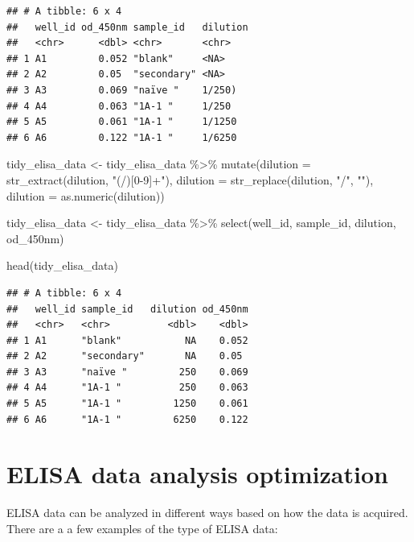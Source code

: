 \documentclass[
]{book}
\newenvironment{Shaded}{\begin{snugshade}}{\end{snugshade}}
\newcommand{\AttributeTok}[1]{\textcolor[rgb]{0.77,0.63,0.00}{#1}}
\newcommand{\FunctionTok}[1]{\textcolor[rgb]{0.00,0.00,0.00}{#1}}
\newcommand{\NormalTok}[1]{#1}
\newcommand{\OtherTok}[1]{\textcolor[rgb]{0.56,0.35,0.01}{#1}}
\newcommand{\SpecialCharTok}[1]{\textcolor[rgb]{0.00,0.00,0.00}{#1}}
\newcommand{\StringTok}[1]{\textcolor[rgb]{0.31,0.60,0.02}{#1}}
\begin{document}
\begin{verbatim}
## # A tibble: 6 x 4
##   well_id od_450nm sample_id   dilution
##   <chr>      <dbl> <chr>       <chr>   
## 1 A1         0.052 "blank"     <NA>    
## 2 A2         0.05  "secondary" <NA>    
## 3 A3         0.069 "naïve "    1/250)  
## 4 A4         0.063 "1A-1 "     1/250   
## 5 A5         0.061 "1A-1 "     1/1250  
## 6 A6         0.122 "1A-1 "     1/6250
\end{verbatim}

\begin{Shaded}
\begin{Highlighting}[]
\NormalTok{tidy\_elisa\_data }\OtherTok{\textless{}{-}}\NormalTok{ tidy\_elisa\_data }\SpecialCharTok{\%\textgreater{}\%}
  \FunctionTok{mutate}\NormalTok{(}\AttributeTok{dilution =} \FunctionTok{str\_extract}\NormalTok{(dilution, }\StringTok{"(/)[0{-}9]+"}\NormalTok{),}
         \AttributeTok{dilution =} \FunctionTok{str\_replace}\NormalTok{(dilution, }\StringTok{"/"}\NormalTok{, }\StringTok{""}\NormalTok{),}
         \AttributeTok{dilution =} \FunctionTok{as.numeric}\NormalTok{(dilution))}

\NormalTok{tidy\_elisa\_data }\OtherTok{\textless{}{-}}\NormalTok{ tidy\_elisa\_data }\SpecialCharTok{\%\textgreater{}\%}
  \FunctionTok{select}\NormalTok{(well\_id, sample\_id, dilution, od\_450nm)}

\FunctionTok{head}\NormalTok{(tidy\_elisa\_data)}
\end{Highlighting}
\end{Shaded}

\begin{verbatim}
## # A tibble: 6 x 4
##   well_id sample_id   dilution od_450nm
##   <chr>   <chr>          <dbl>    <dbl>
## 1 A1      "blank"           NA    0.052
## 2 A2      "secondary"       NA    0.05 
## 3 A3      "naïve "         250    0.069
## 4 A4      "1A-1 "          250    0.063
## 5 A5      "1A-1 "         1250    0.061
## 6 A6      "1A-1 "         6250    0.122
\end{verbatim}

\hypertarget{elisa-data-analysis-optimization}{%
\section{ELISA data analysis optimization}\label{elisa-data-analysis-optimization}}

ELISA data can be analyzed in different ways based on how the data is acquired. There are a a few examples of the type of ELISA data:
\end{document}
